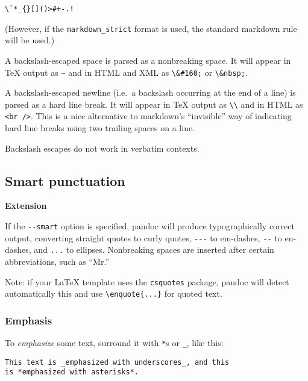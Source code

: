 \documentclass[]{article}
\begin{document}
\begin{verbatim}
\`*_{}[]()>#+-.!
\end{verbatim}

(However, if the \texttt{markdown\_strict} format is used, the standard
markdown rule will be used.)

A backslash-escaped space is parsed as a nonbreaking space. It will
appear in TeX output as \texttt{\textasciitilde{}} and in HTML and XML
as \texttt{\textbackslash{}\&\#160;} or
\texttt{\textbackslash{}\&nbsp;}.

A backslash-escaped newline (i.e.~a backslash occurring at the end of a
line) is parsed as a hard line break. It will appear in TeX output as
\texttt{\textbackslash{}\textbackslash{}} and in HTML as
\texttt{\textless{}br /\textgreater{}}. This is a nice alternative to
markdown's ``invisible'' way of indicating hard line breaks using two
trailing spaces on a line.

Backslash escapes do not work in verbatim contexts.

\subsection{Smart punctuation}

\textbf{Extension}

If the \texttt{-{}-smart} option is specified, pandoc will produce
typographically correct output, converting straight quotes to curly
quotes, \texttt{-{}-{}-} to em-dashes, \texttt{-{}-} to en-dashes, and
\texttt{...} to ellipses. Nonbreaking spaces are inserted after certain
abbreviations, such as ``Mr.''

Note: if your LaTeX template uses the \texttt{csquotes} package, pandoc
will detect automatically this and use
\texttt{\textbackslash{}enquote\{...\}} for quoted text.


\subsubsection{Emphasis}

To \emph{emphasize} some text, surround it with \texttt{*}s or
\texttt{\_}, like this:

\begin{verbatim}
This text is _emphasized with underscores_, and this
is *emphasized with asterisks*.
\end{verbatim}
\end{document}
